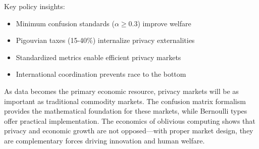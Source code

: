 \documentclass[11pt,final]{article}
\begin{document}
Key policy insights:
\begin{itemize}
    \item Minimum confusion standards ($\alpha \geq 0.3$) improve welfare
    \item Pigouvian taxes (15-40\%) internalize privacy externalities
    \item Standardized metrics enable efficient privacy markets
    \item International coordination prevents race to the bottom
\end{itemize}

As data becomes the primary economic resource, privacy markets will be as important as traditional commodity markets. The confusion matrix formalism provides the mathematical foundation for these markets, while Bernoulli types offer practical implementation. The economics of oblivious computing shows that privacy and economic growth are not opposed—with proper market design, they are complementary forces driving innovation and human welfare.


\end{document}
